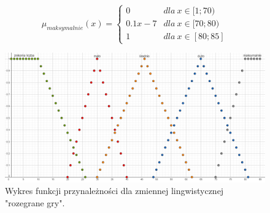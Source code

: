 \documentclass{classrep}
\begin{document}
\begin{enumerate}
\begin{itemize}
\begin{equation}
            \mu_{maksymalnie}(x) = \left\{\begin{matrix} 0 & dla \: x\in [1;70) \\ 0.1x - 7 & dla \: x\in[70;80) \\ 1 & dla \: x\in [80;85] \end{matrix}\right.
        \end{equation}
    \end{itemize}
    \begin{figure}[H]
        \centering
        \includegraphics[width=14cm]{wykres_gry.png}
        \caption{Wykres funkcji przynależności dla zmiennej lingwistycznej "rozegrane gry".}
        \label{rysunek:gry}
    \end{figure}
    

\end{enumerate}
\end{document}
